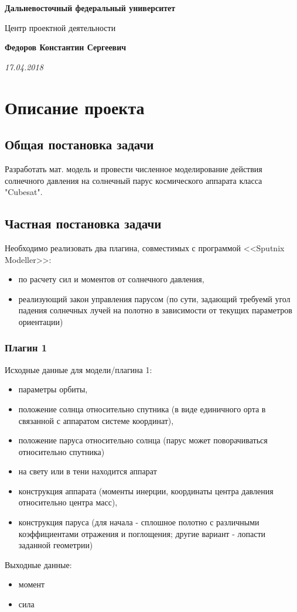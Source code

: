 \documentclass[tikz, a4paper,12pt]{extreport}
\begin{document}
  \begin{center}
    \textbf{Дальневосточный федеральный университет}\par
    Центр проектной деятельности\par
    \textbf{Федоров Константин Сергеевич}\par
    \textit{17.04.2018}
  \end{center}
  \chapter{Описание проекта}\par
  \section{Общая постановка задачи}\par
  \noindent\indent  Разработать мат. модель и провести численное моделирование
  действия солнечного давления на солнечный парус космического аппарата
  класса "Cubesat".
  \section{Частная постановка задачи}\par
    \noindent\indent Необходимо реализовать два плагина, совместимых с программой <<Sputnix Modeller>>:
    \begin{itemize}
      \item по расчету сил и моментов от солнечного давления,
      \item реализующий закон управления парусом (по сути, задающий требуемй
      угол падения солнечных лучей на полотно в зависимости от текущих
      параметров ориентации)
    \end{itemize}
    \subsection{Плагин 1}\par
    \noindent\indent Исходные данные для модели/плагина 1:
    \begin{itemize}
      \item параметры орбиты,
      \item положение солнца относительно спутника (в виде единичного орта в
      связанной с аппаратом системе координат),
      \item положение паруса относительно солнца (парус может поворачиваться
      относительно спутника)
      \item на свету или в тени находится аппарат
      \item конструкция аппарата (моменты инерции, координаты центра давления
      относительно центра масс),
      \item конструкция паруса (для начала - сплошное полотно с различными
      коэффициентами отражения и поглощения; другие вариант - лопасти
      заданной геометрии)
    \end{itemize}\par
    Выходные данные:
    \begin{itemize}
      \item момент
      \item сила
    \end{itemize}
\end{document}
